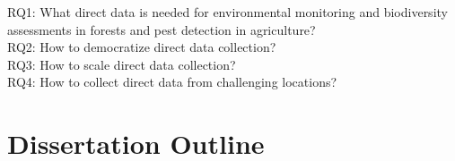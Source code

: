 %


RQ1: What direct data is needed for environmental monitoring and biodiversity assessments in forests and pest detection in agriculture?\\ %

RQ2: How to democratize direct data collection?\\ %

RQ3: How to scale direct data collection?\\%

RQ4: How to collect direct data from challenging locations?\\%



\section{Dissertation Outline}

